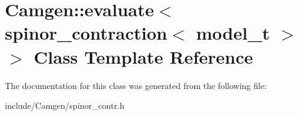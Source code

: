 \hypertarget{a00194}{\section{Camgen\-:\-:evaluate$<$ spinor\-\_\-contraction$<$ model\-\_\-t $>$ $>$ Class Template Reference}
\label{a00194}
}


The documentation for this class was generated from the following file\-:\begin{DoxyCompactItemize}
\item 
include/\-Camgen/spinor\-\_\-contr.\-h\end{DoxyCompactItemize}
